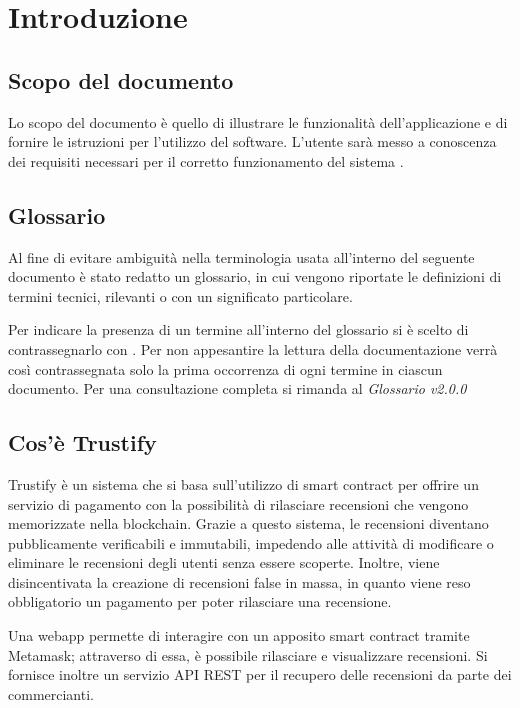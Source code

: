 \section{Introduzione}

\subsection{Scopo del documento}
Lo scopo del documento è quello di illustrare le funzionalità dell'applicazione e di fornire le istruzioni per l'utilizzo del software. L'utente sarà messo a conoscenza dei requisiti necessari per il corretto funzionamento del sistema \capName.

\subsection{Glossario}
Al fine di evitare ambiguità nella terminologia usata all'interno del seguente
documento è stato redatto un glossario, in cui vengono riportate le definizioni
di termini tecnici, rilevanti o con un significato particolare.

Per indicare
la presenza di un termine all'interno del glossario si è scelto di
contrassegnarlo con \glo . Per non appesantire la lettura della documentazione
verrà così contrassegnata solo la prima occorrenza di ogni termine in ciascun
documento.
Per una consultazione completa si rimanda al \textit{Glossario v2.0.0}

\subsection{Cos'è Trustify}
Trustify è un sistema che si basa sull'utilizzo di smart contract per offrire un servizio di pagamento con la possibilità di rilasciare recensioni che vengono memorizzate nella blockchain. Grazie a questo sistema, le recensioni diventano pubblicamente verificabili e immutabili, impedendo alle attività di modificare o eliminare le recensioni degli utenti senza essere scoperte. Inoltre, viene disincentivata la creazione di recensioni false in massa, in quanto viene reso obbligatorio un pagamento per poter rilasciare una recensione.

Una webapp permette di interagire con un apposito smart contract tramite Metamask; attraverso di essa, è possibile rilasciare e visualizzare recensioni. Si fornisce inoltre un servizio API REST per il recupero delle recensioni da parte dei commercianti.

